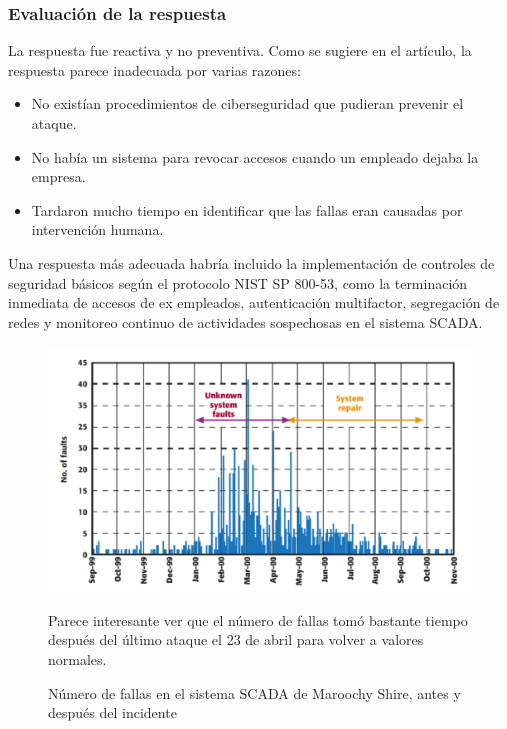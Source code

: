 \subsubsection{Evaluación de la respuesta}

\begin{paracol}{2}
    \colfill
    
    La respuesta fue reactiva y no preventiva. Como se sugiere en el artículo, la respuesta parece inadecuada por varias razones:
    
    \begin{itemize}
        \item No existían procedimientos de ciberseguridad que pudieran prevenir el ataque.
        \item No había un sistema para revocar accesos cuando un empleado dejaba la empresa.
        \item Tardaron mucho tiempo en identificar que las fallas eran causadas por intervención humana.
    \end{itemize}
    
    Una respuesta más adecuada habría incluido la implementación de controles de seguridad básicos según el protocolo NIST SP 800-53, como la terminación inmediata de accesos de ex empleados, autenticación multifactor, segregación de redes y monitoreo continuo de actividades sospechosas en el sistema \textsc{SCADA}.
    \colfill

    \switchcolumn

    \begin{figure}[htbp]
        \centering
            \includegraphics[width=1\columnwidth]{images/maroochyFaults.png}
            \caption{Número de fallas en el sistema \textsc{SCADA} de Maroochy Shire, antes y después del incidente}
            \label{fig:maroochyFaults}

            Parece interesante ver que el número de fallas tomó bastante tiempo después del último ataque el 23 de abril para volver a valores normales.
    \end{figure}

\end{paracol}



